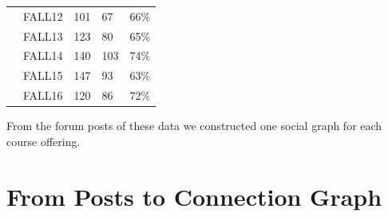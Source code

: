 \begin{table}[]
\begin{tabular}{lllll}
\textbf{}                                                                            & FALL12                                & 101                                                                                       & 67                                                                                         & 66\%                                                                                                  \\
\textbf{}                                                                            & FALL13                                & 123                                                                                       & 80                                                                                         & 65\%                                                                                                  \\
\textbf{}                                                                            & FALL14                                & 140                                                                                       & 103                                                                                        & 74\%                                                                                                  \\
\textbf{}                                                                            & FALL15                                & 147                                                                                       & 93                                                                                         & 63\%                                                                                                  \\
\textbf{}                                                                            & FALL16                                & 120                                                                                       & 86                                                                                         & 72\%                                                                                                 
\end{tabular}
\end{table}

From the forum posts of these data we constructed one social graph for
each course offering.

\section{From Posts to Connection Graph}

